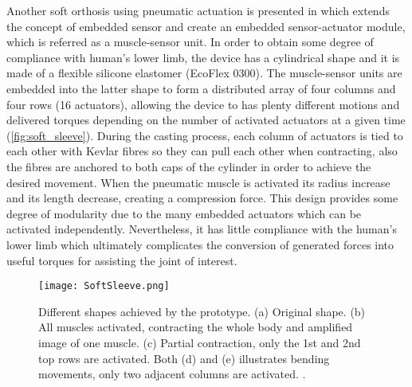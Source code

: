 Another soft orthosis using pneumatic actuation is presented in \cite{Park2012} which extends the concept of embedded sensor and create an embedded sensor-actuator module, which is referred as a muscle-sensor unit. In order to obtain some degree of compliance with human's lower limb, the device has a cylindrical shape and it is made of a flexible silicone elastomer (EcoFlex 0300). The muscle-sensor units are embedded into the latter shape to form a distributed array of four columns and four rows (16 actuators), allowing the device to has plenty different motions and delivered torques depending on the number of activated actuators at a given time (\autoref{fig:soft_sleeve}). During the casting process, each column of actuators is tied to each other with Kevlar fibres so they can pull each other when contracting, also the fibres are anchored to both caps of the cylinder in order to achieve the desired movement. When the pneumatic muscle is activated its radius increase and its length decrease, creating a compression force. This design provides some degree of modularity due to the many embedded actuators which can be activated independently. Nevertheless, it has little compliance with the human's lower limb which ultimately complicates the conversion of generated forces into useful torques for assisting the joint of interest.
\begin{figure}[hbtp!]
    \centering
    \texttt{[image: SoftSleeve.png]}
    \caption{Different shapes achieved by the prototype. (a) Original shape. (b) All muscles activated, contracting the whole body and amplified image of one muscle. (c) Partial contraction, only the 1st and 2nd top rows are activated. Both (d) and (e) illustrates bending movements, only two adjacent columns are activated. \cite{Park2012}. }
    \label{fig:soft_sleeve}
\end{figure}

